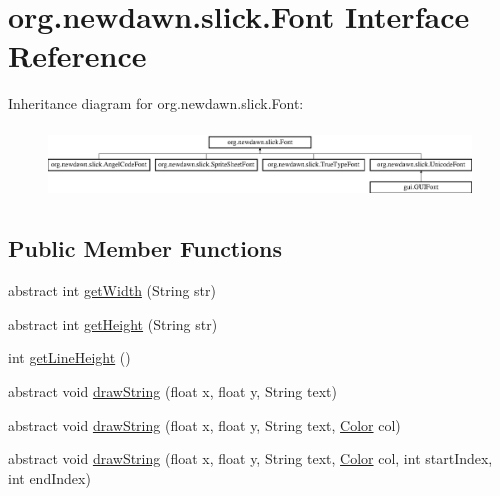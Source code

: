 \hypertarget{interfaceorg_1_1newdawn_1_1slick_1_1_font}{}\section{org.\+newdawn.\+slick.\+Font Interface Reference}
\label{interfaceorg_1_1newdawn_1_1slick_1_1_font}
Inheritance diagram for org.\+newdawn.\+slick.\+Font\+:\begin{figure}[H]
\begin{center}
\leavevmode
\includegraphics[height=1.917808cm]{interfaceorg_1_1newdawn_1_1slick_1_1_font}
\end{center}
\end{figure}
\subsection*{Public Member Functions}
\begin{DoxyCompactItemize}
\item 
abstract int \mbox{\hyperlink{interfaceorg_1_1newdawn_1_1slick_1_1_font_a6dbdd5828730e18fcf0612307d0394b1}{get\+Width}} (String str)
\item 
abstract int \mbox{\hyperlink{interfaceorg_1_1newdawn_1_1slick_1_1_font_ac6a8b604bee484ad3ac2dd57a3eb65c9}{get\+Height}} (String str)
\item 
int \mbox{\hyperlink{interfaceorg_1_1newdawn_1_1slick_1_1_font_aeb4b7770f47c5e2631d84b35924376d7}{get\+Line\+Height}} ()
\item 
abstract void \mbox{\hyperlink{interfaceorg_1_1newdawn_1_1slick_1_1_font_a40b19381efcb64ce1ce4d446eff1e350}{draw\+String}} (float x, float y, String text)
\item 
abstract void \mbox{\hyperlink{interfaceorg_1_1newdawn_1_1slick_1_1_font_afa84859277995b6537d940e466d9f011}{draw\+String}} (float x, float y, String text, \mbox{\hyperlink{classorg_1_1newdawn_1_1slick_1_1_color}{Color}} col)
\item 
abstract void \mbox{\hyperlink{interfaceorg_1_1newdawn_1_1slick_1_1_font_a81ec0a184b55c2f7860d2644bc0731cf}{draw\+String}} (float x, float y, String text, \mbox{\hyperlink{classorg_1_1newdawn_1_1slick_1_1_color}{Color}} col, int start\+Index, int end\+Index)
\end{DoxyCompactItemize}



